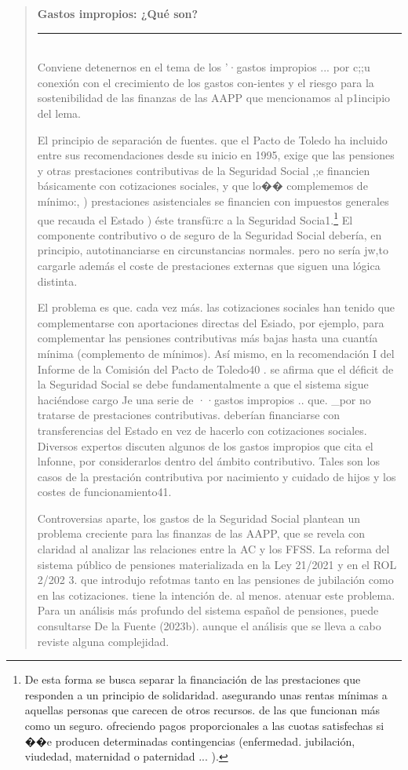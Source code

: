 \documentclass[10pt,a4paper]{article}
\newenvironment{specialblock}[1]{%
      \begin{quote} %
      \small %
      \noindent\textbf{#1}\\[-0.3em] %
      \rule{\linewidth}{0.4pt}\\[0.6em]}{
      \end{quote}}
\begin{document}
\begin{specialblock}{\textbf{Gastos impropios:} ¿Qué son?}
    Conviene detenernos en el tema de los '·gastos impropios ... por c;;u conexión con el crecimiento de los gastos con-ientes y el riesgo para la sostenibilidad de las finanzas de las AAPP que mencionamos al p1incipio del lema.

    El principio de separación de fuentes. que el Pacto de Toledo ha incluido entre sus recomendaciones desde su inicio en 1995, exige que las pensiones y otras prestaciones contributivas de la Seguridad Social ,;e financien básicamente con cotizaciones sociales, y que lo�� complememos de mínimo:, ) prestaciones asistenciales se financien con impuestos generales que recauda el Estado ) éste transfü:rc a la Seguridad Socia1.\footnote{%
        De esta forma se busca separar la financiación de las prestaciones que responden a un principio de solidaridad. asegurando unas rentas mínimas a aquellas personas que carecen de otros recursos. de las que funcionan más como un seguro. ofreciendo pagos proporcionales a las cuotas satisfechas si ��e producen determinadas contingencias (enfermedad. jubilación, viudedad, maternidad o paternidad ... ).
    } El componente contributivo o de seguro de la Seguridad Social debería, en principio, autotinanciarse en circunstancias normales. pero no sería jw,to cargarle además el coste de prestaciones externas que siguen una lógica distinta.

    El problema es que. cada vez más. las cotizaciones sociales han tenido que complementarse con aportaciones directas del Esiado, por ejemplo, para complementar las pensiones contributivas más bajas hasta una cuantía mínima (complemento de mínimos). Así mismo, en la recomendación I del Informe de la Comisión del Pacto de Toledo40 . se afirma que el déficit de la Seguridad Social se debe fundamentalmente a que el sistema sigue haciéndose cargo Je una serie de ··gastos impropios .. que. _por no tratarse de prestaciones contributivas. deberían financiarse con transferencias del Estado en vez de hacerlo con cotizaciones sociales. Diversos expertos discuten algunos de los gastos impropios que cita el lnfonne, por considerarlos dentro del ámbito contributivo. Tales son los casos de la prestación contributiva por nacimiento y cuidado de hijos y los costes de funcionamiento41.

    Controversias aparte, los gastos de la Seguridad Social plantean un problema creciente para las finanzas de las AAPP, que se revela con claridad al analizar las relaciones entre la AC y los FFSS. La reforma del sistema público de pensiones materializada en la Ley 21/2021 y en el ROL 2/202 3. que introdujo refotmas tanto en las pensiones de jubilación como en las cotizaciones. tiene la intención de. al menos. atenuar este problema. Para un análisis más profundo del sistema español de pensiones, puede consultarse De la Fuente (2023b). aunque el análisis que se lleva a cabo reviste alguna complejidad.
\end{specialblock}
\end{document}
